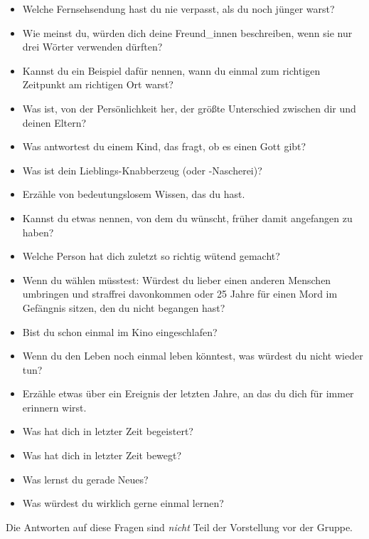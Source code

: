 \begin{itemize}
  \item Welche Fernsehsendung hast du nie verpasst, als du noch jünger warst?
  \item Wie meinst du, würden dich deine Freund\_innen beschreiben, wenn sie nur drei Wörter verwenden dürften?
  \item Kannst du ein Beispiel dafür nennen, wann du einmal zum richtigen Zeitpunkt am richtigen Ort warst?
  \item Was ist, von der Persönlichkeit her, der größte Unterschied zwischen dir und deinen Eltern?
  \item Was antwortest du einem Kind, das fragt, ob es einen Gott gibt?
  \item Was ist dein Lieblings-Knabberzeug (oder -Nascherei)?
  \item Erzähle von bedeutungslosem Wissen, das du hast.
  \item Kannst du etwas nennen, von dem du wünscht, früher damit angefangen zu haben?
  \item Welche Person hat dich zuletzt so richtig wütend gemacht?
  \item Wenn du wählen müsstest: Würdest du lieber einen anderen Menschen umbringen und straffrei davonkommen oder 25 Jahre für einen Mord im Gefängnis sitzen, den du nicht begangen hast?
  \item Bist du schon einmal im Kino eingeschlafen?
  \item Wenn du den Leben noch einmal leben könntest, was würdest du nicht wieder tun?
  \item Erzähle etwas über ein Ereignis der letzten Jahre, an das du dich für immer erinnern wirst.
  \item Was hat dich in letzter Zeit begeistert?
  \item Was hat dich in letzter Zeit bewegt?
  \item Was lernst du gerade Neues?
  \item Was würdest du wirklich gerne einmal lernen?
\end{itemize}

Die Antworten auf diese Fragen sind \emph{nicht} Teil der Vorstellung vor der Gruppe.
